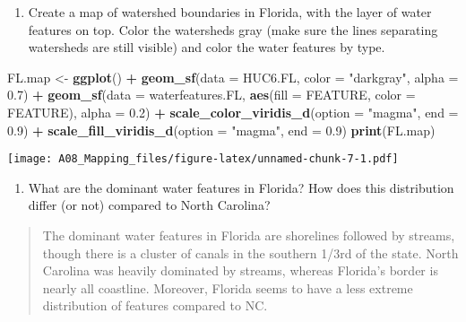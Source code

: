 \documentclass[]{article}
\newenvironment{Shaded}{\begin{snugshade}}{\end{snugshade}}
\newcommand{\DataTypeTok}[1]{\textcolor[rgb]{0.13,0.29,0.53}{#1}}
\newcommand{\FloatTok}[1]{\textcolor[rgb]{0.00,0.00,0.81}{#1}}
\newcommand{\KeywordTok}[1]{\textcolor[rgb]{0.13,0.29,0.53}{\textbf{#1}}}
\newcommand{\NormalTok}[1]{#1}
\newcommand{\OperatorTok}[1]{\textcolor[rgb]{0.81,0.36,0.00}{\textbf{#1}}}
\newcommand{\StringTok}[1]{\textcolor[rgb]{0.31,0.60,0.02}{#1}}
\providecommand{\tightlist}{%
  \setlength{\itemsep}{0pt}\setlength{\parskip}{0pt}}
\begin{document}
\begin{enumerate}
\def\labelenumi{\arabic{enumi}.}
\setcounter{enumi}{10}
\tightlist
\item
  Create a map of watershed boundaries in Florida, with the layer of
  water features on top. Color the watersheds gray (make sure the lines
  separating watersheds are still visible) and color the water features
  by type.
\end{enumerate}

\begin{Shaded}
\begin{Highlighting}[]
\NormalTok{FL.map <-}\StringTok{ }\KeywordTok{ggplot}\NormalTok{() }\OperatorTok{+}
\StringTok{  }\KeywordTok{geom_sf}\NormalTok{(}\DataTypeTok{data =}\NormalTok{ HUC6.FL, }\DataTypeTok{color =} \StringTok{"darkgray"}\NormalTok{, }\DataTypeTok{alpha =} \FloatTok{0.7}\NormalTok{) }\OperatorTok{+}
\StringTok{  }\KeywordTok{geom_sf}\NormalTok{(}\DataTypeTok{data =}\NormalTok{ waterfeatures.FL, }\KeywordTok{aes}\NormalTok{(}\DataTypeTok{fill =}\NormalTok{ FEATURE, }\DataTypeTok{color =}\NormalTok{ FEATURE), }\DataTypeTok{alpha =} \FloatTok{0.2}\NormalTok{) }\OperatorTok{+}
\StringTok{    }\KeywordTok{scale_color_viridis_d}\NormalTok{(}\DataTypeTok{option =} \StringTok{"magma"}\NormalTok{, }\DataTypeTok{end =} \FloatTok{0.9}\NormalTok{) }\OperatorTok{+}
\StringTok{  }\KeywordTok{scale_fill_viridis_d}\NormalTok{(}\DataTypeTok{option =} \StringTok{"magma"}\NormalTok{, }\DataTypeTok{end =} \FloatTok{0.9}\NormalTok{)}
\KeywordTok{print}\NormalTok{(FL.map)}
\end{Highlighting}
\end{Shaded}

\texttt{[image: A08\_Mapping\_files/figure-latex/unnamed-chunk-7-1.pdf]}

\begin{enumerate}
\def\labelenumi{\arabic{enumi}.}
\setcounter{enumi}{11}
\tightlist
\item
  What are the dominant water features in Florida? How does this
  distribution differ (or not) compared to North Carolina?
\end{enumerate}

\begin{quote}
The dominant water features in Florida are shorelines followed by
streams, though there is a cluster of canals in the southern 1/3rd of
the state. North Carolina was heavily dominated by streams, whereas
Florida's border is nearly all coastline. Moreover, Florida seems to
have a less extreme distribution of features compared to NC.
\end{quote}
\end{document}
